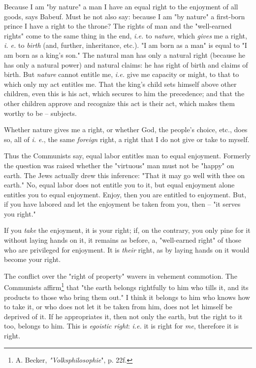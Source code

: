 \documentclass[a4paper]{book}
\begin{document}
Because I am "{}by nature"{} a man I have an equal right to the enjoyment of 
all goods, says Babeuf. Must he not also say: because I am "{}by nature"{} a 
first-born prince I have a right to the throne? The rights of man and the 
"{}well-earned rights"{} come to the same thing in the end, \textit{i.e.} to 
\textit{nature}, which \textit{gives} me a right, \textit{i. e.} to 
\textit{birth} (and, further, inheritance, etc.). "{}I am born as a man"{} is 
equal to "{}I am born as a king's son."{} The natural man has only a natural 
right (because he has only a natural power) and natural claims: he has right 
of birth and claims of birth. But \textit{nature} cannot entitle me, 
\textit{i.e.} give me capacity or might, to that to which only my act entitles 
me. That the king's child sets himself above other children, even this is his 
act, which secures to him the precedence; and that the other children approve 
and recognize this act is their act, which makes them worthy to be -- 
subjects.

Whether nature gives me a right, or whether God, the people's choice, etc., 
does so, all of \textit{i. e.}, the same \textit{foreign} right, a right that 
I do not give or take to myself.

Thus the Communists say, equal labor entitles man to equal enjoyment. Formerly 
the question was raised whether the "{}virtuous"{} man must not be "{}happy"{} 
on earth. The Jews actually drew this inference: "{}That it may go well with 
thee on earth."{} No, equal labor does not entitle you to it, but equal 
enjoyment alone entitles you to equal enjoyment. Enjoy, then you are entitled 
to enjoyment. But, if you have labored and let the enjoyment be taken from 
you, then -- "{}it serves you right."{}

If you \textit{take} the enjoyment, it is your right; if, on the contrary, you 
only pine for it without laying hands on it, it remains as before, a, 
"{}well-earned right"{} of those who are privileged for enjoyment. It is 
\textit{their} right, as by laying hands on it would become your right.

The conflict over the "{}right of property"{} wavers in vehement commotion. 
The Communists affirm\footnote{A. Becker, \textit{"{}Volksphilosophie}"{}, p. 
22f.} that "{}the earth belongs rightfully to him who tills it, and its 
products to those who bring them out."{} I think it belongs to him who knows 
how to take it, or who does not let it be taken from him, does not let himself 
be deprived of it. If he appropriates it, then not only the earth, but the 
right to it too, belongs to him. This is \textit{egoistic right}: 
\textit{i.e.} it is right for \textit{me}, therefore it is right.
\end{document}
